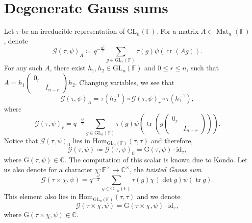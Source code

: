 \documentclass[12pt, reqno]{amsart}
\theoremstyle{definition}
\theoremstyle{definition}
\theoremstyle{definition}
\newcommand{\cComplex}{\mathbb{C}}
\newcommand{\multiplicativegroup}[1]{#1^{\times}}
\newcommand{\Hom}{\mathrm{Hom}}
\newcommand{\idmap}{\mathrm{id}}
\newcommand{\fieldCharacter}{\psi}
\newcommand{\IdentityMatrix}[1]{I_{#1}}
\newcommand{\trace}{\operatorname{tr}}
\newcommand{\GL}{\mathrm{GL}}
\newcommand{\finiteField}{\mathbb{F}}
\newcommand{\squareMatrix}{\operatorname{Mat}}
\newcommand{\GaussSum}[2]{\mathcal{G}\left(#1, #2\right)}
\newcommand{\GaussSumScalar}[2]{\mathrm{G}\left(#1, #2\right)}
\begin{document}
\section{Degenerate Gauss sums}
Let $\tau$ be an irreducible representation of $\GL_n\left(\finiteField\right)$. For a matrix $A \in \squareMatrix_n\left(\finiteField\right)$, denote
$$\GaussSum{\tau}{\fieldCharacter}_A \coloneqq q^{-\frac{n^2}{2}} \sum_{g \in \GL_n\left(\finiteField\right)} \tau\left(g\right) \fieldCharacter\left(\trace\left(A g\right)\right).$$
For any such $A$, there exist $h_1, h_2 \in \GL_n\left(\finiteField\right)$ and $0 \le r \le n$, such that $A = h_1 \begin{pmatrix}
	0_r\\
	& \IdentityMatrix{n-r}
\end{pmatrix} h_2$. Changing variables, we see that $$\GaussSum{\tau}{\fieldCharacter}_A = \tau \left(h_2^{-1}\right) \circ \GaussSum{\tau}{\fieldCharacter}_r \circ \tau\left(h_1^{-1}\right),$$
where
$$\GaussSum{\tau}{\fieldCharacter}_r = q^{-\frac{n^2}{2}} \sum_{g \in \GL_n\left(\finiteField\right)} \tau\left(g\right) \fieldCharacter\left(\trace\left(g \begin{pmatrix}
	0_{r}\\
	& \IdentityMatrix{n-r}
\end{pmatrix}\right)\right).$$
Notice that $\GaussSum{\tau}{\fieldCharacter}_0$ lies in $\Hom_{\GL_n\left(\finiteField\right)}\left(\tau, \tau\right)$ and therefore, $$\GaussSum{\tau}{\fieldCharacter} \coloneqq \GaussSum{\tau}{\fieldCharacter}_0 = \GaussSumScalar{\tau}{\fieldCharacter} \cdot \idmap_\tau,$$
where $\GaussSumScalar{\tau}{\fieldCharacter} \in \cComplex$. The computation of this scalar is known due to Kondo. Let us also denote for a character $\chi \colon \multiplicativegroup{\finiteField} \to \multiplicativegroup{\cComplex}$, the \emph{twisted Gauss sum}
$$\GaussSum{\tau \times \chi}{\fieldCharacter} = q^{-\frac{n^2}{2}} \sum_{g \in \GL_n\left(\finiteField\right)} \tau\left(g\right) \chi\left(\det g\right) \fieldCharacter\left(\trace g\right).$$
This element also lies in $\Hom_{\GL_n\left(\finiteField\right)}\left(\tau, \tau\right)$ and we denote
$$\GaussSum{\tau \times \chi}{\fieldCharacter} = \GaussSumScalar{\tau \times \chi}{\fieldCharacter} \cdot \idmap_\tau,$$
where $\GaussSumScalar{\tau \times \chi}{\fieldCharacter} \in \cComplex$.
\end{document}
